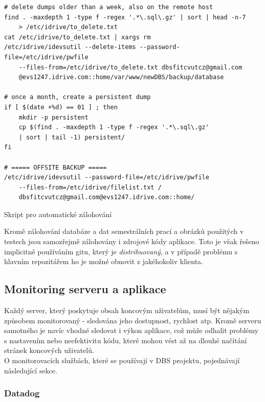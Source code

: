 \begin{listing}[H]
	\begin{verbatim}
# delete dumps older than a week, also on the remote host
find . -maxdepth 1 -type f -regex '.*\.sql\.gz' | sort | head -n-7
    > /etc/idrive/to_delete.txt
cat /etc/idrive/to_delete.txt | xargs rm
/etc/idrive/idevsutil --delete-items --password-file=/etc/idrive/pwfile
    --files-from=/etc/idrive/to_delete.txt dbsfitcvutcz@gmail.com
    @evs1247.idrive.com::home/var/www/newDBS/backup/database

# once a month, create a persistent dump
if [ $(date +%d) == 01 ] ; then
    mkdir -p persistent
    cp $(find . -maxdepth 1 -type f -regex '.*\.sql\.gz'
    | sort | tail -1) persistent/
fi

# ===== OFFSITE BACKUP =====
/etc/idrive/idevsutil --password-file=/etc/idrive/pwfile
    --files-from=/etc/idrive/filelist.txt /
    dbsfitcvutcz@gmail.com@evs1247.idrive.com::home/
	\end{verbatim}
	\caption{Skript pro automatické zálohování} \label{code:backup}
\end{listing}
Kromě zálohování databáze a dat semestrálních prací a obrázků použitých v testech jsou samozřejmě zálohovány i zdrojové kódy aplikace. Toto je však řešeno implicitně používáním gitu, který je \emph{distribuovaný}, a v případě problému s hlavním repozitářem ho je možné obnovit z jakéhokoliv klienta.

\subsection{Monitoring serveru a aplikace}

Každý server, který poskytuje obsah koncovým uživatelům, musí být nějakým způsobem monitorovaný - sledována jeho dostupnost, rychlost atp. Kromě serveru samotného je navíc vhodné sledovat i výkon aplikace, což může odhalit problémy s nastavením nebo neefektivitu kódu, které mohou vést až na dlouhé načítání stránek koncových uživatelů.\\
O monitorovacích službách, které se používají v DBS projektu, pojednávají následující sekce.

\subsubsection{Datadog} \label{app:datadog}

